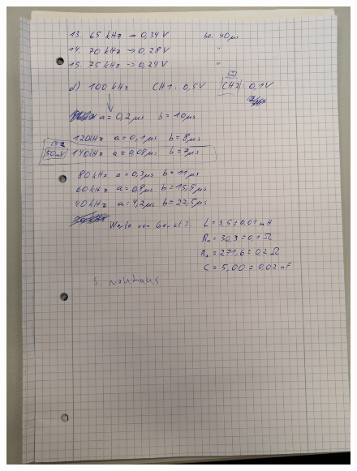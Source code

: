 \begin{figure}
    \centering
    \includegraphics[scale = 0.25]{content/Orginaldaten2.jpg}
\end{figure}